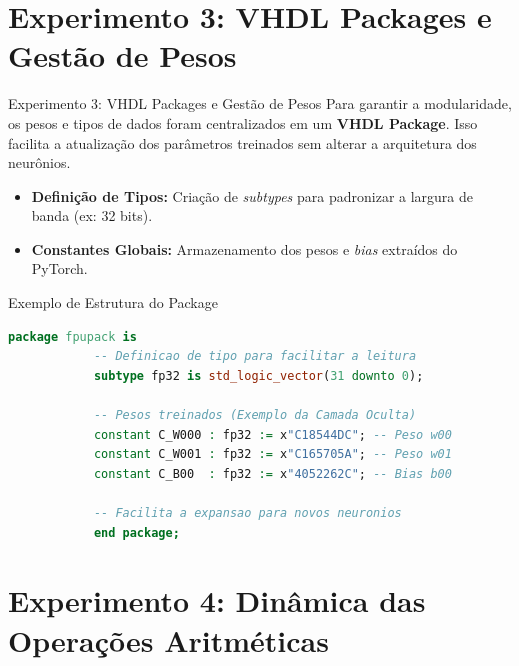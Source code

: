\documentclass[aspectratio=169]{beamer}
\begin{document}
\section{Experimento 3: VHDL Packages e Gestão de Pesos}

\begin{frame}[fragile]{Experimento 3: VHDL Packages e Gestão de Pesos}
	\justifying
	Para garantir a modularidade, os pesos e tipos de dados foram centralizados em um \textbf{VHDL Package}. Isso facilita a atualização dos parâmetros treinados sem alterar a arquitetura dos neurônios.
	
	\begin{itemize}
		\item \textbf{Definição de Tipos:} Criação de \textit{subtypes} para padronizar a largura de banda (ex: 32 bits).
		\item \textbf{Constantes Globais:} Armazenamento dos pesos e \textit{bias} extraídos do PyTorch.
	\end{itemize}
	
	\begin{exampleblock}{Exemplo de Estrutura do Package}
		\begin{lstlisting}[language=VHDL, basicstyle=\tiny]
			package fpupack is
			-- Definicao de tipo para facilitar a leitura
			subtype fp32 is std_logic_vector(31 downto 0);
			
			-- Pesos treinados (Exemplo da Camada Oculta)
			constant C_W000 : fp32 := x"C18544DC"; -- Peso w00
			constant C_W001 : fp32 := x"C165705A"; -- Peso w01
			constant C_B00  : fp32 := x"4052262C"; -- Bias b00
			
			-- Facilita a expansao para novos neuronios
			end package;
		\end{lstlisting}
	\end{exampleblock}
\end{frame}








\section{Experimento 4: Dinâmica das Operações Aritméticas}
\end{document}
